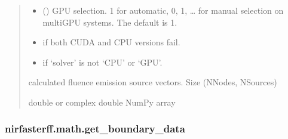 \documentclass[letterpaper,10pt,english]{sphinxmanual}
\begin{document}
\begin{fulllineitems}
\begin{quote}
\begin{description}
\begin{itemize}
\item {} 
\sphinxAtStartPar
{} (\sphinxstyleliteralemphasis{\sphinxupquote{, }}) \textendash{} GPU selection. \sphinxhyphen{}1 for automatic, 0, 1, … for manual selection on multi\sphinxhyphen{}GPU systems. The default is \sphinxhyphen{}1.

\end{itemize}

\begin{itemize}
\item {} 
\sphinxAtStartPar
{} \textendash{} if both CUDA and CPU versions fail.

\item {} 
\sphinxAtStartPar
{} \textendash{} if ‘solver’ is not ‘CPU’ or ‘GPU’.

\end{itemize}

\sphinxAtStartPar
{} \textendash{} calculated fluence emission source vectors. Size (NNodes, NSources)

\sphinxAtStartPar
double or complex double NumPy array

\end{description}\end{quote}

\end{fulllineitems}


\sphinxstepscope


\subsubsection{nirfasterff.math.get\_boundary\_data}
\label{\detokenize{_autosummary/nirfasterff.math.get_boundary_data:nirfasterff-math-get-boundary-data}}\label{\detokenize{_autosummary/nirfasterff.math.get_boundary_data::doc}}
\end{document}
